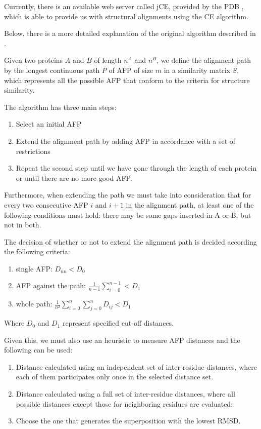 Currently, there is an available web server called jCE, provided by the \gls{PDB} \cite{berman2000protein}, which is able to provide us with structural alignments using the CE algorithm.

Below, there is a more detailed explanation of the original algorithm described in \cite{shindyalov1998protein}.

Given two proteins $A$ and $B$ of length $n^A$ and $n^B$, we define the alignment path by the longest continuous path $P$ of AFP of size $m$ in a similarity matrix $S$, which represents all the possible AFP that conform to the criteria for structure similarity.

The algorithm has three main steps:
\begin{enumerate}
	\item Select an initial AFP
	\item Extend the alignment path by adding AFP in accordance with a set of restrictions
	\item Repeat the second step until we have gone through the length of each protein or until there are no more good AFP.
\end{enumerate}

Furthermore, when extending the path we must take into consideration that for every two consecutive AFP $i$ and $i+1$ in the alignment path, at least one of the following conditions must hold: there may be some gaps inserted in A or B, but not in both.

The decision of whether or not to extend the alignment path is decided according the following criteria:
\begin{enumerate}
	\item single AFP: $D_{nn} < D_0$
	\item AFP against the path: $\frac{1}{n-1}\sum_{i=0}^{n-1} < D_1$
	\item whole path: $\frac{1}{n^2}\sum_{i=0}^{n}\sum_{j=0}^{n}D_{ij} < D_1$
\end{enumerate}

Where $D_0$ and $D_1$ represent specified cut-off distances.

Given this, we must also use an heuristic to measure AFP distances and the following can be used:
\begin{enumerate}
	\item Distance calculated using an independent set of inter-residue distances, where each of them participates only once in the selected distance set.
	
	\item Distance calculated using a full set of inter-residue distances, where all possible distances except those for neighboring residues are evaluated:
	
	\item Choose the one that generates the superposition with the lowest RMSD.
\end{enumerate}

